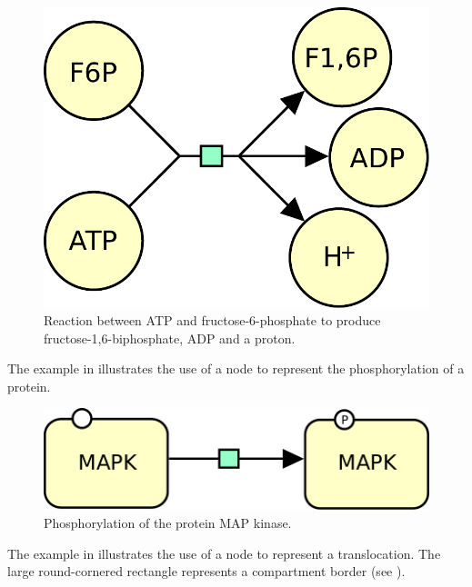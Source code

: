 \begin{figure}[H]
  \centering
  \includegraphics[scale = 0.5]{le_images/process-reaction}
  \caption{Reaction between ATP and fructose-6-phosphate to produce fructose-1,6-biphosphate, ADP and a proton.}
  \label{fig:trans-react}
\end{figure}

The example in  illustrates the use of a  node to represent the phosphorylation of a protein. 

\begin{figure}[H]
  \centering
  \includegraphics[scale = 0.5]{le_images/process-phosphorylation}
  \caption{Phosphorylation of the protein MAP kinase.}
  \label{fig:trans-phos}
\end{figure}


The example in  illustrates the use of a  node to represent a translocation. The large round-cornered rectangle represents a compartment border (see ).

